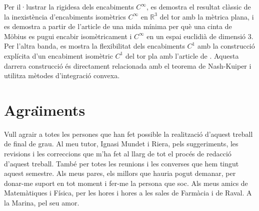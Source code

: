 \documentclass[11pt,a4paper,openright,oneside]{book}
\numberwithin{equation}{section}
\theoremstyle{definition}
\begin{document}
Per il·lustrar la rigidesa dels encabiments $C^\infty$, es demostra el resultat clàssic de la inexistència d'encabiments isomètrics $C^\infty$ en $\mathbb R^3$ del tor amb la mètrica plana, i es demostra a partir de l'article de \cite{schwartz2024} una mida mínima per què una cinta de Möbius es pugui encabir isomètricament i $C^\infty$ en un espai euclidià de dimensió 3. Per l'altra banda, es mostra la flexibilitat dels encabiments $C^1$ amb la construcció explícita d'un encabiment isomètric $C^1$ del tor pla amb l'article de \cite{borrelli2013}. Aquesta darrera construcció és directament relacionada amb el teorema de Nash-Kuiper i utilitza mètodes d'integració convexa.

\newpage 


\section*{Agra\"{\i}ments}
Vull agrair a totes les persones que han fet possible la realització d'aquest treball de final de grau.
Al meu tutor, Ignasi Mundet i Riera, pels suggeriments, les revisions i les correccions que m'ha fet al llarg de tot el procés de redacció d'aquest treball. També per totes les reunions i les converses que hem tingut aquest semestre.
Als meus pares, els millors que hauria pogut demanar, per donar-me suport en tot moment i fer-me la persona que soc.
Als meus amics de Matemàtiques i Física, per les hores i hores a les sales de Farmàcia i de Raval.
A la Marina, pel seu amor.

\newpage

\tableofcontents

\newpage








%



\normalfont
\end{document}
